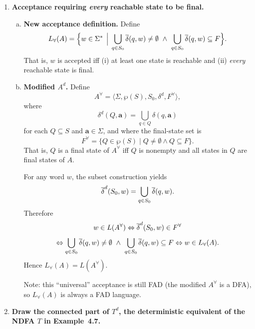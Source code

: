\begin{enumerate}[{4.}1.]
\item \textbf{Acceptance requiring \emph{every} reachable state to be final.}

\begin{enumerate}[(a)]
  \item \textbf{New acceptance definition.}  Define
  \[
  L_{\forall}(A)=\Bigl\{w\in\Sigma^* \,\Bigm|\,
  \bigcup_{q\in S_0}\overline{\delta}(q,w)\neq\emptyset
  \ \wedge\
  \bigcup_{q\in S_0}\overline{\delta}(q,w)\subseteq F\Bigr\}.
  \]
  That is, $w$ is accepted iff (i) at least one state is reachable and
  (ii) \emph{every} reachable state is final.

  \item \textbf{Modified $A^d$.}  Define
  \[
    A^{\forall}=\langle \Sigma,\wp(S),S_0,\delta^d,F^{\forall}\rangle,
  \]
  where
  \[
    \delta^d(Q,\pmb{a})=\bigcup_{q\in Q}\delta(q,\pmb{a})
  \]
  for each $Q\subseteq S$ and $\pmb{a}\in\Sigma$, and where the final-state set is
  \[
    F^{\forall}=\{Q\in\wp(S)\mid Q\neq\emptyset\wedge Q\subseteq F\}.
  \]
  That is, $Q$ is a final state of $A^{\forall}$ iff $Q$ is nonempty and
  all states in $Q$ are final states of $A$.

  For any word $w$, the subset construction yields
  \[
    \overline{\delta}^d(S_0,w)=\bigcup_{q\in S_0}\overline{\delta}(q,w).
  \]
  Therefore
  \[
    w\in L(A^{\forall})
    \Leftrightarrow
    \overline{\delta}^d(S_0,w)\in F^{\forall}
  \]
  \[
    \Leftrightarrow
    \bigcup_{q\in S_0}\overline{\delta}(q,w)\neq\emptyset
    \ \wedge\
    \bigcup_{q\in S_0}\overline{\delta}(q,w)\subseteq F
    \Leftrightarrow
    w\in L_{\forall}(A).
  \]
  Hence $L_{\forall}(A)=L(A^{\forall})$.

  Note: this ``universal'' acceptance is still FAD (the modified $A^{\forall}$
  is a DFA), so $L_{\forall}(A)$ is always a FAD language.
\end{enumerate}

\item \textbf{Draw the connected part of $T^d$, the deterministic equivalent of
the NDFA $T$ in Example~4.7.}


\end{enumerate}
